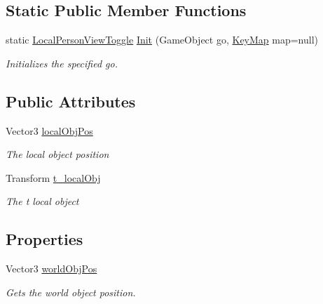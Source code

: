 \subsection*{Static Public Member Functions}
\begin{DoxyCompactItemize}
\item 
static \hyperlink{class_lerp2_a_p_i_1_1_controllers_1_1_person_view_1_1_local_person_view_toggle}{Local\+Person\+View\+Toggle} \hyperlink{class_lerp2_a_p_i_1_1_controllers_1_1_person_view_1_1_local_person_view_toggle_a6517f9b0a7a0c1e0d736ba71c9cf32bc}{Init} (Game\+Object go, \hyperlink{class_lerp2_a_p_i_1_1_hepers_1_1_unity___extensions_1_1_utils_1_1_key_map}{Key\+Map} map=null)
\begin{DoxyCompactList}\small\item\em Initializes the specified go. \end{DoxyCompactList}\end{DoxyCompactItemize}
\subsection*{Public Attributes}
\begin{DoxyCompactItemize}
\item 
Vector3 \hyperlink{class_lerp2_a_p_i_1_1_controllers_1_1_person_view_1_1_local_person_view_toggle_a3cbe0ca91c200339159432dda95d6d38}{local\+Obj\+Pos}
\begin{DoxyCompactList}\small\item\em The local object position \end{DoxyCompactList}\item 
Transform \hyperlink{class_lerp2_a_p_i_1_1_controllers_1_1_person_view_1_1_local_person_view_toggle_a2ea34ba8ccbddf5138fb8596d117a258}{t\+\_\+local\+Obj}
\begin{DoxyCompactList}\small\item\em The t local object \end{DoxyCompactList}\end{DoxyCompactItemize}
\subsection*{Properties}
\begin{DoxyCompactItemize}
\item 
Vector3 \hyperlink{class_lerp2_a_p_i_1_1_controllers_1_1_person_view_1_1_local_person_view_toggle_a8a2013a72cf31e77d0409c1291762165}{world\+Obj\+Pos}
\begin{DoxyCompactList}\small\item\em Gets the world object position. \end{DoxyCompactList}\end{DoxyCompactItemize}
